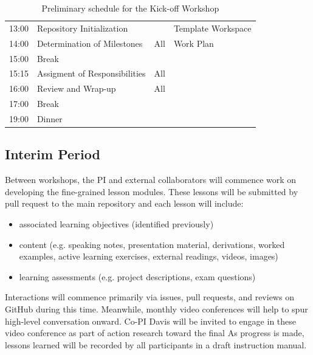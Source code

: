 \documentclass[11pt]{article}
\begin{document}
\begin{table}[h!]
\begin{tabularx}{\textwidth}{r|l|l|X}
13:00& Repository Initialization&&  Template Workspace\\
14:00& Determination of Milestones& All& Work Plan\\
15:00& Break&&  \\
15:15& Assigment of Responsibilities& All&  \\
16:00& Review and Wrap-up& All&  \\
17:00& Break&&  \\
19:00& Dinner&&  \\
\hline
                  \end{tabularx}
                  \caption{Preliminary schedule for the Kick-off Workshop}
                  \label{tab:kickoff}
          \end{table}


          \subsection{Interim Period}
          Between workshops, the PI and external collaborators will commence 
          work on developing 
          the fine-grained lesson modules. These lessons will be submitted by pull request to the main 
          repository and each lesson will include:
          \begin{itemize} 
                \item associated learning objectives (identified previously)
                \item content (e.g. speaking notes, presentation material, 
                      derivations, worked examples, active learning  
                      exercises, external readings, videos, images)
                \item learning assessments (e.g. project descriptions, exam questions) 
          \end{itemize} 

          Interactions will commence primarily via issues, pull requests, and 
          reviews on GitHub during this time. Meanwhile, monthly video 
          conferences will help to spur high-level conversation onward.
          Co-PI Davis will be invited to engage in these video conference as 
          part of action research toward the final 
          As progress is made, lessons learned will be recorded by all 
          participants in a draft instruction manual.
\end{document}

